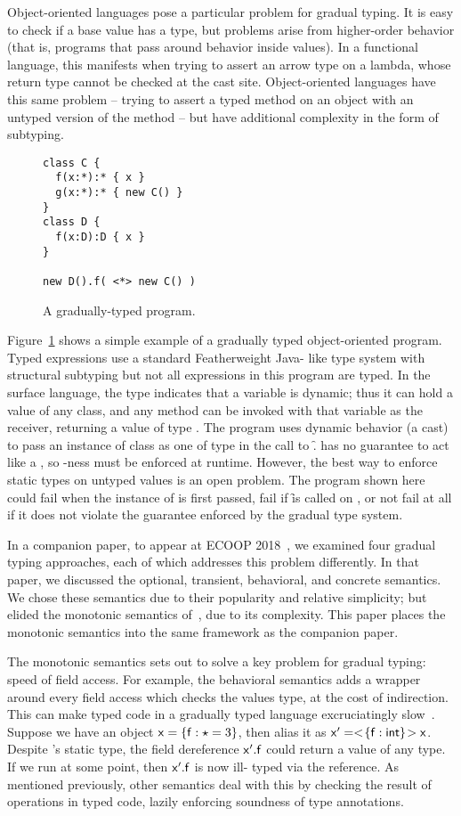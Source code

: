 \documentclass[sigconf]{acmart}
\begin{document}
Object-oriented languages pose a particular problem for gradual typing. It is
easy to check if a base value has a type, but problems arise from higher-order
behavior (that is, programs that pass around behavior inside values). In a
functional language, this manifests when trying to assert an arrow type on a
lambda, whose return type cannot be checked at the cast site. Object-oriented
languages have this same problem -- trying to assert a typed method on an
object with an untyped version of the method -- but have additional complexity
in the form of subtyping.

\begin{figure}[h]
\begin{lstlisting}
class C { 
  f(x:*):* { x } 
  g(x:*):* { new C() }
}
class D { 
  f(x:D):D { x }
}

new D().f( <*> new C() )
\end{lstlisting}
\caption{A gradually-typed program.}
\label{fig:simpleprog}
\end{figure}

Figure~\ref{fig:simpleprog} shows a simple example of a gradually typed
object-oriented program. Typed expressions use a standard Featherweight Java-
like type system with structural subtyping but not all expressions in this
program are typed. In the surface language, the type \any indicates that a
variable is dynamic; thus it can hold a value of any class, and any method can
be invoked with that variable as the receiver, returning a value of type \any.
The program uses dynamic behavior (a cast) to pass an instance of class \C as
one of type \D in the call to \f. \C has no guarantee to act like a \D, so
\D-ness must be enforced at runtime. However, the best way to enforce static
types on untyped values is an open problem. The program shown here could fail
when the instance of \C is first passed, fail if \f is called on \x, or not
fail at all if it does not violate the guarantee enforced by the gradual type
system.

In a companion paper, to appear at ECOOP 2018~\cite{us}, we examined four
gradual typing approaches, each of which addresses this problem differently.
In that paper, we discussed the optional, transient, behavioral, and concrete
semantics. We chose these semantics due to their popularity and relative
simplicity; but elided the monotonic semantics of~\cite{siek14}, due to its
complexity. This paper places the monotonic semantics into the same framework
as the companion paper.

The monotonic semantics sets out to solve a key problem for gradual typing:
speed of field access. For example, the behavioral semantics adds a wrapper
around every field access which checks the values type, at the cost of
indirection. This can make typed code in a gradually typed language
excruciatingly slow~\cite{popl16}.  Suppose we have an object $\x = \{ \f:\any
= 3 \}$, then alias it as $\xp = \SubCast{\{ \f:\xt{int}   \}}\x$. Despite
\xp's static type, the field dereference $\xp.\f$ could return a value of any
type. If we run  at some point, then $\xp.\f$ is now ill-
typed via the reference. As mentioned previously, other semantics deal with
this by checking the result of operations in typed code, lazily enforcing
soundness of type annotations.
\end{document}
